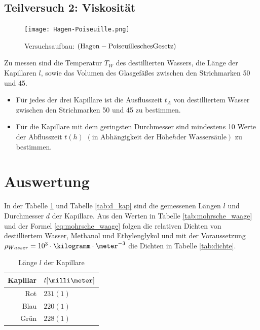 \documentclass[12pt, a4paper, twoside]{scrartcl}
\begin{document}
\subsection{Teilversuch 2: Viskosität}
\begin{figure}
\centering
\texttt{[image: Hagen-Poiseuille.png]}
\caption{Versuchsaufbau: $\left( \rm{Hagen-Poiseuillesches Gesetz} \right)$}
\end{figure}
Zu messen sind die Temperatur $T_W$ des destillierten Wassers, die Länge der Kapillaren $l$, sowie das Volumen des Glasgefäßes zwischen den Strichmarken 50 und 45.\\
\begin{itemize}
\item Für jedes der drei Kapillare ist die Ausflusszeit $t_A$ von destilliertem Wasser zwischen den Strichmarken  50 und 45 zu bestimmen.
\item Für die Kapillare mit dem geringsten Durchmesser sind mindestens 10 Werte der Abflusszeit $t \left( h \right)$ $\left( \textrm{in Abhängigkeit der Höhe} h \textrm{der Wassersäule} \right)$ zu bestimmen.
\end{itemize}

\section{Auswertung}
\label{sec:auswertung}

In der Tabelle \ref{tab:l_kap} und Tabelle \ref{tab:d_kap} sind die gemessenen Längen $l$ und Durchmesser $d$ der Kapillare.
Aus den Werten in Tabelle \ref{tab:mohrsche_waage} und der Formel \eqref{eq:mohrsche_waage} folgen die relativen Dichten von destilliertem Wasser, Methanol und Ethylenglykol und mit der Voraussetzung $\rho _{Wasser} = 10^{3}\cdot\kilogramm\cdot\meter^{-3}$ die Dichten in Tabelle \ref{tab:dichte}.

\begin{table}[!h]
\centering
\begin{tabular}{r|l}
    Kapillar & $l[\milli\meter]$\\
    \hline
    Rot & $231(1)$\\
    Blau & $220(1)$\\
    Grün & $228(1)$\\
    
 \end{tabular} 
 \caption{\label{tab:l_kap}Länge $l$ der Kapillare}
\end{table}
\end{document}
